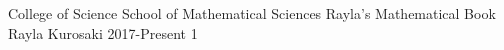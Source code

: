 \documentclass{rayla_textbook}
\begin{document}
    {College of Science}
    {School of Mathematical Sciences}
    {Rayla's Mathematical Book}
    {Rayla Kurosaki}
    {2017-Present}
    {1}

    

    ~\nocite{*}

    \raylaEndBook
    
\end{document}
